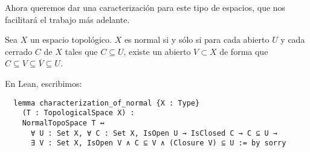 Ahora queremos dar una caracterización para este tipo de espacios, que nos facilitará el trabajo más adelante.

\begin{proposition}
  Sea $X$ un espacio topológico. $X$ es normal si y sólo si para cada abierto $U$ y cada cerrado $C$ de $X$ tales que $C \subseteq U$, existe un abierto $V \subset X$ de forma que $C \subseteq V \subseteq \overline{V} \subseteq U$.
\end{proposition}

En Lean, escribimos:

\begin{lstlisting}
  lemma characterization_of_normal {X : Type}
    (T : TopologicalSpace X) :
    NormalTopoSpace T ↔
      ∀ U : Set X, ∀ C : Set X, IsOpen U → IsClosed C → C ⊆ U →
      ∃ V : Set X, IsOpen V ∧ C ⊆ V ∧ (Closure V) ⊆ U := by sorry
\end{lstlisting}

